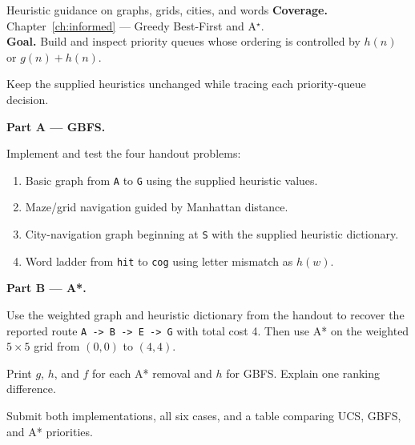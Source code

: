 
\begin{labproject}{Heuristic guidance on graphs, grids, cities, and words}
\textbf{Coverage.} Chapter~\ref{ch:informed} --- Greedy Best-First and A$^\star$.\\
\textbf{Goal.} Build and inspect priority queues whose ordering is controlled by \(h(n)\) or \(g(n)+h(n)\).

\begin{labmode}
Keep the supplied heuristics unchanged while tracing each priority-queue decision.
\end{labmode}

\medskip\noindent\textbf{Part A --- GBFS.}\par
Implement and test the four handout problems:
\begin{enumerate}
  \item Basic graph from \texttt{A} to \texttt{G} using the supplied heuristic values.
  \item Maze/grid navigation guided by Manhattan distance.
  \item City-navigation graph beginning at \texttt{S} with the supplied heuristic dictionary.
  \item Word ladder from \texttt{hit} to \texttt{cog} using letter mismatch as \(h(w)\).
\end{enumerate}

\medskip\noindent\textbf{Part B --- A*.}\par
Use the weighted graph and heuristic dictionary from the handout to recover the reported route \texttt{A -> B -> E -> G} with total cost 4. Then use A* on the weighted \(5\times5\) grid from \((0,0)\) to \((4,4)\).

\begin{tryit}
Print \(g\), \(h\), and \(f\) for each A* removal and \(h\) for GBFS. Explain one ranking difference.
\end{tryit}
\end{labproject}

\begin{labdeliverable}
Submit both implementations, all six cases, and a table comparing UCS, GBFS, and A* priorities.
\end{labdeliverable}
